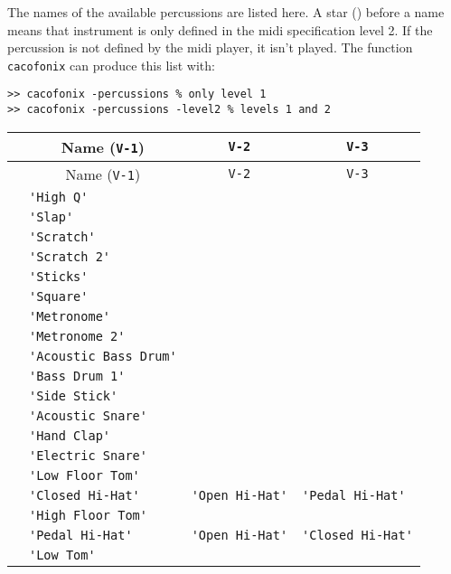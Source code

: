 \documentclass{article}
\newcommand\lvlo{}
\newcommand\lvlt{\ding{105}}
\begin{document}
The names of the available percussions are listed here. A star (\lvlt) before a name means that instrument is only defined in the midi specification level 2. If the percussion is not defined by the midi player, it isn't played. The function \lstinline!cacofonix! can produce this list with:
\begin{lstlisting}
>> cacofonix -percussions % only level 1
>> cacofonix -percussions -level2 % levels 1 and 2
\end{lstlisting}

\begin{center}
\begin{longtable}{llll}
  & \multicolumn{1}{c}{Name (\lstinline!V-1!)} & \multicolumn{1}{c}{\lstinline!V-2!} & \multicolumn{1}{c}{\lstinline!V-3!} \\
\endfirsthead
  & \multicolumn{1}{c}{Name (\lstinline!V-1!)} & \multicolumn{1}{c}{\lstinline!V-2!} & \multicolumn{1}{c}{\lstinline!V-3!} \\
\endhead
 \lvlt & \lstinline!'High Q'! & & \\
 \lvlt & \lstinline!'Slap'! & & \\
 \lvlt & \lstinline!'Scratch'! & & \\
 \lvlt & \lstinline!'Scratch 2'! & & \\
 \lvlt & \lstinline!'Sticks'! & & \\
 \lvlt & \lstinline!'Square'! & & \\
 \lvlt & \lstinline!'Metronome'! & & \\
 \lvlt & \lstinline!'Metronome 2'! & & \\
 \lvlo & \lstinline!'Acoustic Bass Drum'! & & \\
 \lvlo & \lstinline!'Bass Drum 1'! & & \\
 \lvlo & \lstinline!'Side Stick'! & & \\
 \lvlo & \lstinline!'Acoustic Snare'! & & \\
 \lvlo & \lstinline!'Hand Clap'! & & \\
 \lvlo & \lstinline!'Electric Snare'! & & \\
 \lvlo & \lstinline!'Low Floor Tom'! & & \\
 \lvlo & \lstinline!'Closed Hi-Hat'! & \lstinline!'Open Hi-Hat'! & \lstinline!'Pedal Hi-Hat'! \\
 \lvlo & \lstinline!'High Floor Tom'! & & \\
 \lvlo & \lstinline!'Pedal Hi-Hat'! & \lstinline!'Open Hi-Hat'! & \lstinline!'Closed Hi-Hat'! \\
 \lvlo & \lstinline!'Low Tom'! & & \\

\end{longtable}
\end{center}
\end{document}
